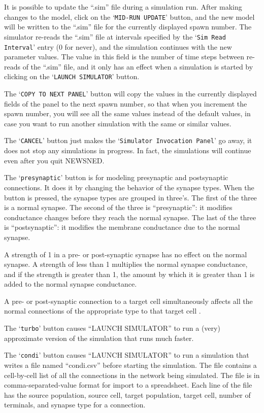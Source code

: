 \documentclass[12pt,openany,oneside]{book}
\newcommand{\tiw}[1]{\mbox{#1}}
\newcommand{\tisamp}[1]{`\texttt{#1}'}
\begin{document}
It is possible to update the ``.sim'' file during a simulation run.
After making changes to the model, click on the \tisamp{MID-RUN UPDATE}
button, and the new model will be written to the ``.sim'' file for the
currently displayed spawn number.  The simulator re-reads the ``.sim''
file at intervals specified by the \tisamp{Sim Read Interval} entry (0
for never), and the simulation continues with the new parameter
values.  The value in this field is the number of time steps between
re-reads of the ``.sim'' file, and it only has an effect when a
simulation is started by clicking on the \tiw{\tisamp{LAUNCH SIMULATOR}}
button.

The \tiw{\tisamp{COPY TO NEXT PANEL}} button will copy the values in the
currently displayed fields of the panel to the next spawn number, so
that when you increment the spawn number, you will see all the same
values instead of the default values, in case you want to run another
simulation with the same or similar values.

The \tiw{\tisamp{CANCEL}} button just makes the \tisamp{Simulator Invocation
Panel} go away, it does not stop any simulations in progress.  In
fact, the simulations will continue even after you quit NEWSNED.

\label{presynaptic}
The \tiw{\tisamp{presynaptic}} button is for modeling presynaptic and
postsynaptic connections.  It does it by changing the behavior of the
synapse types.  When the button is pressed, the synapse types are
grouped in three's.  The first of the three is a normal synapse.  The
second of the three is ``presynaptic'': it modifies conductance
changes before they reach the normal synapse.  The last of the three
is ``postsynaptic'': it modifies the membrane conductance due to the
normal synapse.

A strength of 1 in a pre- or post-synaptic synapse has no effect on
the normal synapse.  A strength of less than 1 multiplies the normal
synapse conductance, and if the strength is greater than 1, the amount
by which it is greater than 1 is added to the normal synapse
conductance.

A pre- or post-synaptic connection to a target cell simultaneously
affects all the normal connections of the appropriate type to that
target cell .

The \tiw{\tisamp{turbo}} button causes ``LAUNCH SIMULATOR'' to run a
(very) approximate version of the simulation that runs much faster.

The \tiw{\tisamp{condi}} button causes ``LAUNCH SIMULATOR'' to run a
simulation that writes a file named ``condi.csv'' before starting the
simulation.  The file contains a cell-by-cell list of all the
connections in the network being simulated.  The file is in
comma-separated-value format for import to a spreadsheet.  Each line
of the file has the source population, source cell, target population,
target cell, number of terminals, and synapse type for a connection.
\end{document}
